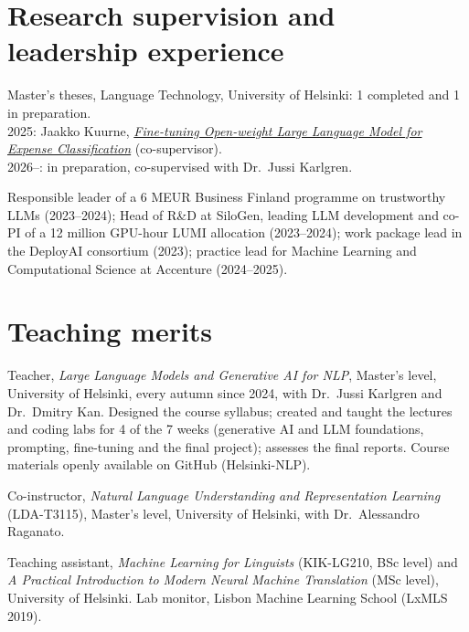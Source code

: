\documentclass[12pt,a4paper]{article}
\newenvironment{entries}{%
  \begin{list}{}{%
    \setlength{\labelwidth}{2.7cm}%
    \setlength{\labelsep}{0.3cm}%
    \setlength{\leftmargin}{3.0cm}%
    \setlength{\itemsep}{2pt}%
    \setlength{\parsep}{0pt}%
    \setlength{\topsep}{1pt}%
    \renewcommand{\makelabel}[1]{##1\hfil}}}%
  {\end{list}}
\begin{document}
\section{Research supervision and leadership experience}
\begin{entries}
  \item[Supervision] Master's theses, Language Technology, University of Helsinki: 1 completed and 1 in preparation.\\
  2025: Jaakko Kuurne, \href{https://helda.helsinki.fi/items/ef08b419-a925-4e2e-b3bc-4e22d5e65448}{\emph{Fine-tuning Open-weight Large Language Model for Expense Classification}} (co-supervisor).\\
  2026--: in preparation, co-supervised with Dr.\ Jussi Karlgren.
  \item[Leadership] Responsible leader of a 6 MEUR Business Finland programme on trustworthy LLMs (2023--2024); Head of R\&D at SiloGen, leading LLM development and co-PI of a 12 million GPU-hour LUMI allocation (2023--2024); work package lead in the DeployAI consortium (2023); practice lead for Machine Learning and Computational Science at Accenture (2024--2025).
\end{entries}

\section{Teaching merits}
\begin{entries}
  \item[2024--] Teacher, \emph{Large Language Models and Generative AI for NLP}, Master's level, University of Helsinki, every autumn since 2024, with Dr.\ Jussi Karlgren and Dr.\ Dmitry Kan. Designed the course syllabus; created and taught the lectures and coding labs for 4 of the 7 weeks (generative AI and LLM foundations, prompting, fine-tuning and the final project); assesses the final reports. Course materials openly available on GitHub (Helsinki-NLP).
  \item[2020] Co-instructor, \emph{Natural Language Understanding and Representation Learning} (LDA-T3115), Master's level, University of Helsinki, with Dr.\ Alessandro Raganato.
  \item[2019] Teaching assistant, \emph{Machine Learning for Linguists} (KIK-LG210, BSc level) and \emph{A Practical Introduction to Modern Neural Machine Translation} (MSc level), University of Helsinki. Lab monitor, Lisbon Machine Learning School (LxMLS 2019).
\end{entries}
\end{document}

